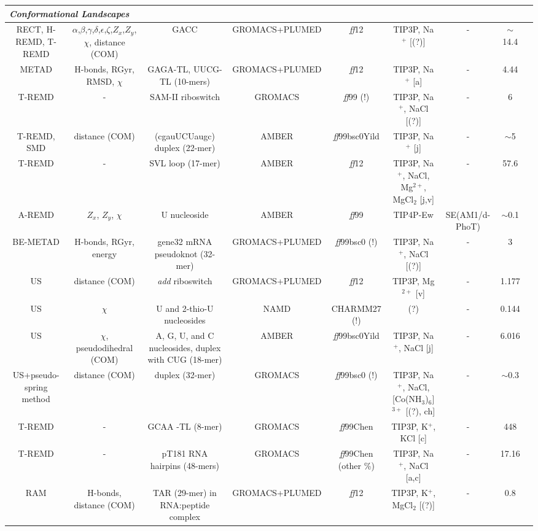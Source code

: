 \begin{tabular}{ccccccccc}
\midrule 
\multicolumn{9}{l}{\emph{Conformational Landscapes}}\tabularnewline
\midrule 
RECT, H-REMD, T-REMD & $\alpha$,$\beta$,$\gamma$,$\delta$,$\epsilon$,$\zeta$,$Z_{x}$,$Z_{y}$,$\chi$, distance (COM) & GACC & GROMACS+PLUMED & \emph{ff}12 & TIP3P, Na$^{+}$ {[}(?){]} & - & $\sim$14.4 & \cite{gil2015}\tabularnewline
\midrule 
METAD & H-bonds, RGyr, RMSD, $\chi$ & GAGA-TL, UUCG-TL (10-mers) & GROMACS+PLUMED & \emph{ff}12 & TIP3P, Na$^{+}$ {[}a{]} & - & 4.44 & \cite{haldar2015insights}\tabularnewline
\midrule 
T-REMD & - & SAM-II riboswitch & GROMACS & \emph{ff}99 (!) & TIP3P, Na$^{+}$, NaCl {[}(?){]} & - & 6 & \cite{xue2015folding}\tabularnewline
\midrule 
T-REMD, SMD & distance (COM) & (cgauUCUaugc) duplex (22-mer) & AMBER & \emph{ff}99bsc0Yild & TIP3P, Na$^{+}$ {[}j{]} & - & $\sim$5 & \cite{park2015crystallographic}\tabularnewline
\midrule 
T-REMD & - & SVL loop (17-mer) & AMBER & \emph{ff}12 & TIP3P, Na$^{+}$, NaCl, Mg$^{2+}$, MgCl$_{2}$ {[}j,v{]} & - & 57.6 & \cite{bergonzo2015stem}\tabularnewline
\midrule 
A-REMD & $Z_{x}$, $Z_{y}$, $\chi$ & U nucleoside & AMBER & \emph{ff}99 & TIP4P-Ew & SE(AM1/d-PhoT) & $\sim$0.1 & \cite{radak2015characterization}\tabularnewline
\midrule 
BE-METAD & H-bonds, RGyr, energy & gene32 mRNA pseudoknot (32-mer) & GROMACS+PLUMED & \emph{ff}99bsc0 (!) & TIP3P, Na$^{+}$, NaCl {[}(?){]} & - & 3 & \cite{bian2015free}\tabularnewline
\midrule 
US & distance (COM) & \emph{add }riboswitch & GROMACS+PLUMED & \emph{ff}12 & TIP3P, Mg$^{2+}$ {[}v{]} & - & 1.177 & \cite{di2015kissing}\tabularnewline
\midrule 
US & $\chi$ & U and 2-thio-U nucleosides & NAMD & CHARMM27 (!) & (?) & - & 0.144 & \cite{larsen2015thermodynamic}\tabularnewline
\midrule 
US & $\chi$, pseudodihedral (COM) & A, G, U, and C nucleosides, duplex with CUG (18-mer) & AMBER & \emph{ff}99bsc0Yild & TIP3P, Na$^{+}$, NaCl {[}j{]} & - & 6.016 & \cite{yildirim2015computational}\tabularnewline
\midrule
US+pseudo-spring method & distance (COM) & duplex (32-mer) & GROMACS & \emph{ff}99bsc0 (!) & TIP3P, Na$^{+}$, NaCl, {[}Co(NH$_{3}$)$_{6}${]}$^{3+}$ {[}(?), ch{]} & - & $\sim$0.3 & \cite{wu2015multivalent}\tabularnewline
\midrule 
T-REMD & - & GCAA -TL (8-mer) & GROMACS & \emph{ff}99Chen & TIP3P, K$^{+}$, KCl {[}c{]} & - & 448  & \cite{miner2016free}\tabularnewline
\midrule
T-REMD & - & pT181 RNA hairpins (48-mers) & GROMACS & \emph{ff}99Chen (other \%) & TIP3P, Na$^{+}$, NaCl {[}a,c{]} & - & 17.16 & \cite{takahashi2016using}\tabularnewline
\midrule
RAM & H-bonds, distance (COM) & TAR (29-mer) in RNA:peptide complex & GROMACS+PLUMED & \emph{ff}12 & TIP3P, K$^{+}$, MgCl$_{2}$ {[}(?){]} & - & 0.8 & \cite{borkar2016structure}\tabularnewline

\end{tabular}
